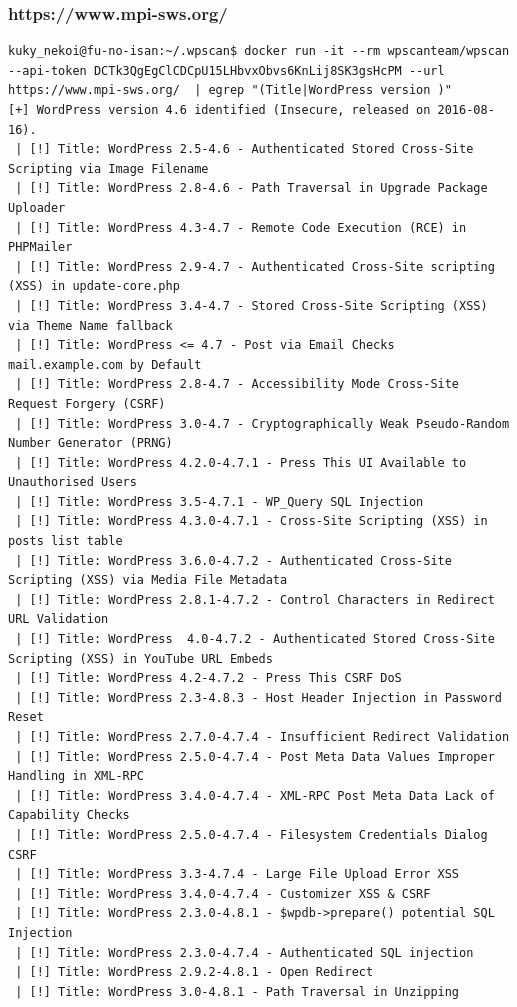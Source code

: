 \documentclass[11pt]{utalcaDoc}
\begin{document}
\subsubsection{https://www.mpi-sws.org/}
\begin{verbatim}
kuky_nekoi@fu-no-isan:~/.wpscan$ docker run -it --rm wpscanteam/wpscan --api-token DCTk3QgEgClCDCpU15LHbvxObvs6KnLij8SK3gsHcPM --url https://www.mpi-sws.org/  | egrep "(Title|WordPress version )"
[+] WordPress version 4.6 identified (Insecure, released on 2016-08-16).
 | [!] Title: WordPress 2.5-4.6 - Authenticated Stored Cross-Site Scripting via Image Filename
 | [!] Title: WordPress 2.8-4.6 - Path Traversal in Upgrade Package Uploader
 | [!] Title: WordPress 4.3-4.7 - Remote Code Execution (RCE) in PHPMailer
 | [!] Title: WordPress 2.9-4.7 - Authenticated Cross-Site scripting (XSS) in update-core.php
 | [!] Title: WordPress 3.4-4.7 - Stored Cross-Site Scripting (XSS) via Theme Name fallback
 | [!] Title: WordPress <= 4.7 - Post via Email Checks mail.example.com by Default
 | [!] Title: WordPress 2.8-4.7 - Accessibility Mode Cross-Site Request Forgery (CSRF)
 | [!] Title: WordPress 3.0-4.7 - Cryptographically Weak Pseudo-Random Number Generator (PRNG)
 | [!] Title: WordPress 4.2.0-4.7.1 - Press This UI Available to Unauthorised Users
 | [!] Title: WordPress 3.5-4.7.1 - WP_Query SQL Injection
 | [!] Title: WordPress 4.3.0-4.7.1 - Cross-Site Scripting (XSS) in posts list table
 | [!] Title: WordPress 3.6.0-4.7.2 - Authenticated Cross-Site Scripting (XSS) via Media File Metadata
 | [!] Title: WordPress 2.8.1-4.7.2 - Control Characters in Redirect URL Validation
 | [!] Title: WordPress  4.0-4.7.2 - Authenticated Stored Cross-Site Scripting (XSS) in YouTube URL Embeds
 | [!] Title: WordPress 4.2-4.7.2 - Press This CSRF DoS
 | [!] Title: WordPress 2.3-4.8.3 - Host Header Injection in Password Reset
 | [!] Title: WordPress 2.7.0-4.7.4 - Insufficient Redirect Validation
 | [!] Title: WordPress 2.5.0-4.7.4 - Post Meta Data Values Improper Handling in XML-RPC
 | [!] Title: WordPress 3.4.0-4.7.4 - XML-RPC Post Meta Data Lack of Capability Checks 
 | [!] Title: WordPress 2.5.0-4.7.4 - Filesystem Credentials Dialog CSRF
 | [!] Title: WordPress 3.3-4.7.4 - Large File Upload Error XSS
 | [!] Title: WordPress 3.4.0-4.7.4 - Customizer XSS & CSRF
 | [!] Title: WordPress 2.3.0-4.8.1 - $wpdb->prepare() potential SQL Injection
 | [!] Title: WordPress 2.3.0-4.7.4 - Authenticated SQL injection
 | [!] Title: WordPress 2.9.2-4.8.1 - Open Redirect
 | [!] Title: WordPress 3.0-4.8.1 - Path Traversal in Unzipping

\end{verbatim}
\end{document}
